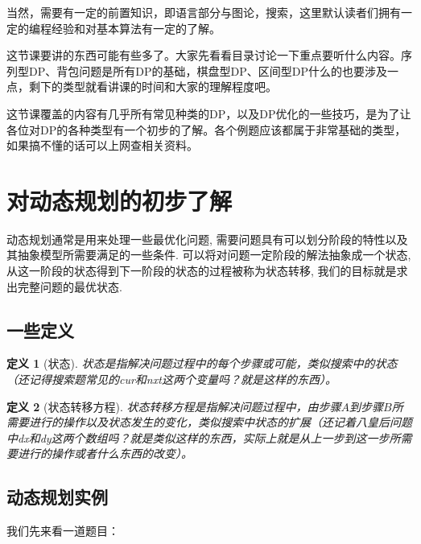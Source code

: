 \documentclass{article}
\newtheorem{definition}{定义}[subsection]
\theoremstyle{nonumberplain}
\begin{document}
当然，需要有一定的前置知识，即语言部分与图论，搜索，这里默认读者们拥有一定的编程经验和对基本算法有一定的了解。

这节课要讲的东西可能有些多了。大家先看看目录讨论一下重点要听什么内容。序列型DP、背包问题是所有DP的基础，棋盘型DP、区间型DP什么的也要涉及一点，剩下的类型就看讲课的时间和大家的理解程度吧。

这节课覆盖的内容有几乎所有常见种类的DP，以及DP优化的一些技巧，是为了让各位对DP的各种类型有一个初步的了解。各个例题应该都属于非常基础的类型，如果搞不懂的话可以上网查相关资料。


\newpage

\section{对动态规划的初步了解}
动态规划通常是用来处理一些最优化问题, 需要问题具有可以划分阶段的特性以及其抽象模型所需要满足的一些条件.
可以将对问题一定阶段的解法抽象成一个状态, 从这一阶段的状态得到下一阶段的状态的过程被称为状态转移, 我们的目标就是求出完整问题的最优状态.
\subsection{一些定义}
\begin{definition}[状态]
	状态是指解决问题过程中的每个步骤或可能，类似搜索中的状态（还记得搜索题常见的cur和nxt这两个变量吗？就是这样的东西）。
\end{definition}
\begin{definition}[状态转移方程]
	状态转移方程是指解决问题过程中，由步骤$A$到步骤$B$所需要进行的操作以及状态发生的变化，类似搜索中状态的扩展（还记着八皇后问题中dx和dy这两个数组吗？就是类似这样的东西，实际上就是从上一步到这一步所需要进行的操作或者什么东西的改变）。
\end{definition}

\subsection{动态规划实例}
我们先来看一道题目：
\end{document}
